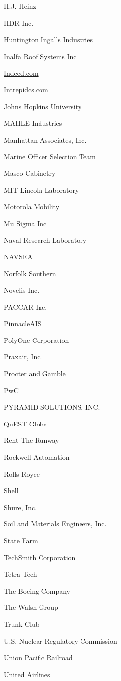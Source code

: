 \documentclass[twoside]{article}
\begin{document}
\begin{center}
\begin{multicols}{5}
\begin{FlushLeft}
\begin{compactitem}
\item H.J. Heinz
\item HDR Inc.
\item Huntington Ingalls Industries
\item Inalfa Roof Systems Inc
\item \url{Indeed.com}
\item \url{Intrepidcs.com}
\item Johns Hopkins University
\item MAHLE Industries
\item Manhattan Associates, Inc.
\item Marine Officer Selection Team
\item Masco Cabinetry
\item MIT Lincoln Laboratory
\item Motorola Mobility
\item Mu Sigma Inc
\item Naval Research Laboratory
\item NAVSEA
\item Norfolk Southern
\item Novelis Inc.
\item PACCAR Inc.
\item PinnacleAIS
\item PolyOne Corporation
\item Praxair, Inc.
\item Procter and Gamble
\item PwC
\item PYRAMID SOLUTIONS, INC.
\item QuEST Global
\item Rent The Runway
\item Rockwell Automation
\item Rolls-Royce
\item Shell
\item Shure, Inc.
\item Soil and Materials Engineers, Inc.
\item State Farm
\item TechSmith Corporation
\item Tetra Tech
\item The Boeing Company
\item The Walsh Group
\item Trunk Club
\item U.S. Nuclear Regulatory Commission
\item Union Pacific Railroad
\item United Airlines

\end{compactitem}
\end{FlushLeft}
\end{multicols}
\end{center}
\end{document}

